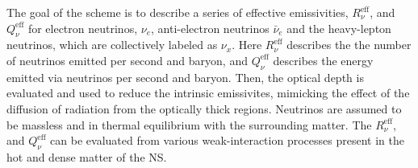 
%
The goal of the scheme is to describe a series of effective emissivities, 
$R_{\nu}^{\text{eff}}$, and $Q_{\nu}^{\text{eff}}$ for electron neutrinos, $\nu_e$, 
anti-electron neutrinos $\bar{\nu}_e$ and the heavy-lepton neutrinos, 
which are collectively labeled as $\nu_x$.
Here $R_{\nu}^{\text{eff}}$ describes the the number of neutrinos emitted per second and baryon,
and $Q_{\nu}^{\text{eff}}$ describes the energy emitted via neutrinos per second and baryon.
%
Then, the optical depth is evaluated and used to reduce the intrinsic emissivites, 
mimicking the effect of the diffusion of radiation from the optically thick regions.
%
%
Neutrinos are assumed to be massless and in thermal equilibrium with the surrounding matter.
%
%
The $R_{\nu}^{\text{eff}}$, and $Q_{\nu}^{\text{eff}}$ can be evaluated from various 
weak-interaction processes present in the hot and dense matter of the NS. 
